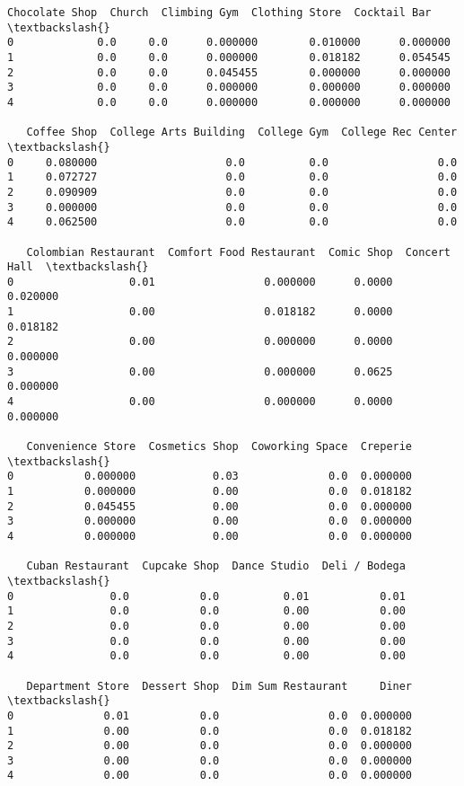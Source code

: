 \documentclass[11pt]{article}
\begin{document}
\begin{tcolorbox}[breakable, size=fbox, boxrule=.5pt, pad at break*=1mm, opacityfill=0]
\begin{Verbatim}[commandchars=\\\{\}]
   Chocolate Shop  Church  Climbing Gym  Clothing Store  Cocktail Bar  \textbackslash{}
0             0.0     0.0      0.000000        0.010000      0.000000
1             0.0     0.0      0.000000        0.018182      0.054545
2             0.0     0.0      0.045455        0.000000      0.000000
3             0.0     0.0      0.000000        0.000000      0.000000
4             0.0     0.0      0.000000        0.000000      0.000000

   Coffee Shop  College Arts Building  College Gym  College Rec Center  \textbackslash{}
0     0.080000                    0.0          0.0                 0.0
1     0.072727                    0.0          0.0                 0.0
2     0.090909                    0.0          0.0                 0.0
3     0.000000                    0.0          0.0                 0.0
4     0.062500                    0.0          0.0                 0.0

   Colombian Restaurant  Comfort Food Restaurant  Comic Shop  Concert Hall  \textbackslash{}
0                  0.01                 0.000000      0.0000      0.020000
1                  0.00                 0.018182      0.0000      0.018182
2                  0.00                 0.000000      0.0000      0.000000
3                  0.00                 0.000000      0.0625      0.000000
4                  0.00                 0.000000      0.0000      0.000000

   Convenience Store  Cosmetics Shop  Coworking Space  Creperie  \textbackslash{}
0           0.000000            0.03              0.0  0.000000
1           0.000000            0.00              0.0  0.018182
2           0.045455            0.00              0.0  0.000000
3           0.000000            0.00              0.0  0.000000
4           0.000000            0.00              0.0  0.000000

   Cuban Restaurant  Cupcake Shop  Dance Studio  Deli / Bodega  \textbackslash{}
0               0.0           0.0          0.01           0.01
1               0.0           0.0          0.00           0.00
2               0.0           0.0          0.00           0.00
3               0.0           0.0          0.00           0.00
4               0.0           0.0          0.00           0.00

   Department Store  Dessert Shop  Dim Sum Restaurant     Diner  \textbackslash{}
0              0.01           0.0                 0.0  0.000000
1              0.00           0.0                 0.0  0.018182
2              0.00           0.0                 0.0  0.000000
3              0.00           0.0                 0.0  0.000000
4              0.00           0.0                 0.0  0.000000


\end{Verbatim}
\end{tcolorbox}
\end{document}
